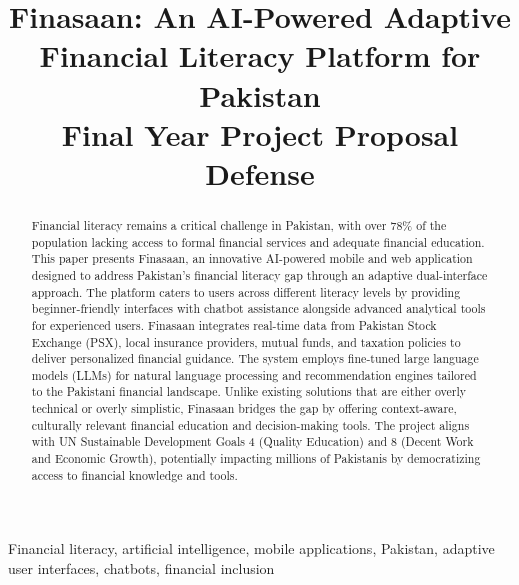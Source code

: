 \documentclass[conference]{IEEEtran}
\begin{document}
\title{Finasaan: An AI-Powered Adaptive Financial Literacy Platform for Pakistan\\
{\footnotesize Final Year Project Proposal Defense}}

\author{
}

\maketitle

\begin{abstract}
Financial literacy remains a critical challenge in Pakistan, with over 78\% of the population lacking access to formal financial services and adequate financial education. This paper presents Finasaan, an innovative AI-powered mobile and web application designed to address Pakistan's financial literacy gap through an adaptive dual-interface approach. The platform caters to users across different literacy levels by providing beginner-friendly interfaces with chatbot assistance alongside advanced analytical tools for experienced users. Finasaan integrates real-time data from Pakistan Stock Exchange (PSX), local insurance providers, mutual funds, and taxation policies to deliver personalized financial guidance. The system employs fine-tuned large language models (LLMs) for natural language processing and recommendation engines tailored to the Pakistani financial landscape. Unlike existing solutions that are either overly technical or overly simplistic, Finasaan bridges the gap by offering context-aware, culturally relevant financial education and decision-making tools. The project aligns with UN Sustainable Development Goals 4 (Quality Education) and 8 (Decent Work and Economic Growth), potentially impacting millions of Pakistanis by democratizing access to financial knowledge and tools.
\end{abstract}

\begin{IEEEkeywords}
Financial literacy, artificial intelligence, mobile applications, Pakistan, adaptive user interfaces, chatbots, financial inclusion
\end{IEEEkeywords}
\end{document}
